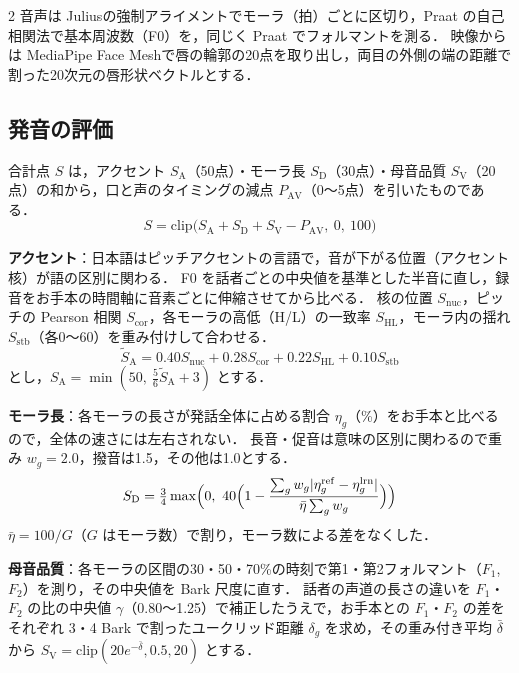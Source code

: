 \begin{multicols*}{2}
音声は Julius\cite{lee2009}の強制アライメントでモーラ（拍）ごとに区切り，Praat の自己相関法\cite{boersma1993}で基本周波数（F0）を，同じく Praat でフォルマントを測る．
映像からは MediaPipe Face Mesh\cite{kartynnik2019}で唇の輪郭の20点を取り出し，両目の外側の端の距離で割った20次元の唇形状ベクトルとする．


\subsection{発音の評価}
合計点 $S$ は，アクセント $S_{\mathrm{A}}$（50点）・モーラ長 $S_{\mathrm{D}}$（30点）・母音品質 $S_{\mathrm{V}}$（20点）の和から，口と声のタイミングの減点 $P_{\mathrm{AV}}$（0〜5点）を引いたものである．
\begin{equation}
S = \mathrm{clip}\bigl(S_{\mathrm{A}} + S_{\mathrm{D}} + S_{\mathrm{V}} - P_{\mathrm{AV}},\ 0,\ 100\bigr)
\end{equation}

\textbf{アクセント}：日本語はピッチアクセントの言語で，音が下がる位置（アクセント核）が語の区別に関わる．
F0 を話者ごとの中央値を基準とした半音に直し，録音をお手本の時間軸に音素ごとに伸縮させてから比べる．
核の位置 $S_{\mathrm{nuc}}$，ピッチの Pearson 相関 $S_{\mathrm{cor}}$，各モーラの高低（H/L）の一致率 $S_{\mathrm{HL}}$，モーラ内の揺れ $S_{\mathrm{stb}}$（各0〜60）を重み付けして合わせる．
\begin{equation}
\tilde{S}_{\mathrm{A}} = 0.40 S_{\mathrm{nuc}} + 0.28 S_{\mathrm{cor}} + 0.22 S_{\mathrm{HL}} + 0.10 S_{\mathrm{stb}}
\end{equation}
とし，$S_{\mathrm{A}} = \min(50,\ \tfrac{5}{6}\tilde{S}_{\mathrm{A}} + 3)$ とする．

\textbf{モーラ長}：各モーラの長さが発話全体に占める割合 $\eta_g$（\%）をお手本と比べるので，全体の速さには左右されない．
長音・促音は意味の区別に関わるので重み $w_g = 2.0$，撥音は1.5，その他は1.0とする．
\begin{equation}
S_{\mathrm{D}} = \tfrac{3}{4}\max\Bigl(0,\ 40\Bigl(1 - \frac{\sum_g w_g \lvert \eta^{\mathrm{ref}}_g - \eta^{\mathrm{lrn}}_g \rvert}{\bar{\eta}\sum_g w_g}\Bigr)\Bigr)
\end{equation}
$\bar{\eta} = 100/G$（$G$ はモーラ数）で割り，モーラ数による差をなくした．

\textbf{母音品質}：各モーラの区間の30・50・70\%の時刻で第1・第2フォルマント（$F_1$, $F_2$）を測り，その中央値を Bark 尺度\cite{traunmuller1990}に直す．
話者の声道の長さの違いを $F_1$・$F_2$ の比の中央値 $\gamma$（0.80〜1.25）で補正したうえで，お手本との $F_1$・$F_2$ の差をそれぞれ 3・4 Bark で割ったユークリッド距離 $\delta_g$ を求め，その重み付き平均 $\bar{\delta}$ から $S_{\mathrm{V}} = \mathrm{clip}(20 e^{-\bar{\delta}}, 0.5, 20)$ とする．



\end{multicols*}

